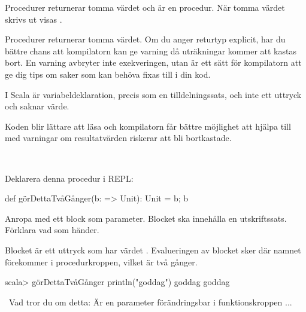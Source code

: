\SOLUTION

\TaskSolved \what

\SubtaskSolved Procedurer returnerar tomma värdet och  är en procedur. När tomma värdet skrivs ut visas \code{()}.

\SubtaskSolved Procedurer returnerar tomma värdet. Om du anger returtyp  explicit, har du bättre chans att kompilatorn kan ge varning då uträkningar kommer att kastas bort. En varning avbryter inte exekveringen, utan är ett sätt för kompilatorn att ge dig tips om saker som kan behöva fixas till i din kod.

\SubtaskSolved I Scala är variabeldeklaration, precis som en tilldelningssats, och inte ett uttryck och saknar värde.

\SubtaskSolved  Koden blir lättare att läsa och kompilatorn får bättre möjlighet att hjälpa till med varningar om resultatvärden riskerar att bli bortkastade.

\QUESTEND



\QUESTBEGIN

\Task  \what~

Deklarera denna procedur i REPL:
\begin{Code}
def görDettaTvåGånger(b: => Unit): Unit = { b; b }
\end{Code}

Anropa  med ett block som parameter. Blocket ska innehålla en utskriftssats. Förklara vad som händer.

\SOLUTION

\TaskSolved \what

Blocket är ett uttryck som har värdet . Evalueringen av blocket sker där namnet  förekommer i procedurkroppen, vilket är två gånger.
\begin{REPL}
scala> görDettaTvåGånger { println("goddag") }
goddag
goddag
\end{REPL}

\QUESTEND




\clearpage

\AdvancedTasks %





\QUESTBEGIN

\Task \what~Vad tror du om detta: Är en parameter förändringsbar i funktionskroppen ...

